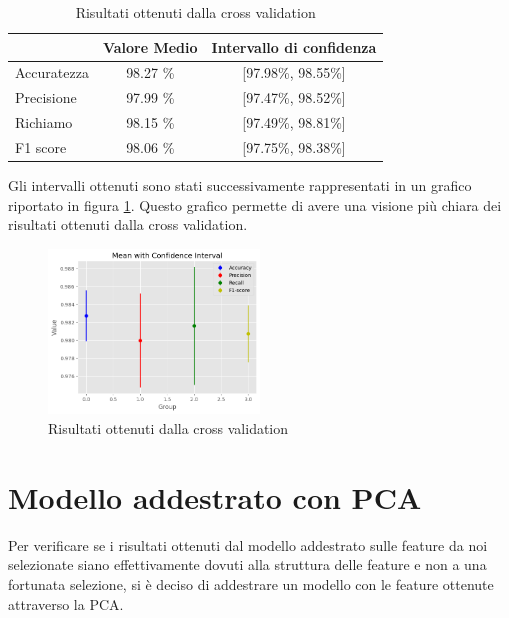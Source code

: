 \begin{table}[ht]
    \centering
    \begin{tabular}{@{}lcc@{}}
        \toprule
        \rowcolor[HTML]{EFEFEF}
        \multicolumn{1}{c}{\cellcolor[HTML]{EFEFEF}\textbf{Metrica}} & \textbf{Valore Medio} & \textbf{Intervallo di confidenza} \\ \midrule
        Accuratezza                                                  & 98.27 \%              & [97.98\%, 98.55\%]                \\
        Precisione                                                   & 97.99 \%              & [97.47\%, 98.52\%]                \\
        Richiamo                                                     & 98.15 \%              & [97.49\%, 98.81\%]                \\
        F1 score                                                     & 98.06 \%              & [97.75\%, 98.38\%]                \\ \bottomrule
    \end{tabular}
    \caption{Risultati ottenuti dalla cross validation}
    \label{tab:risultatiCrossValidation}
\end{table}

Gli intervalli ottenuti sono stati successivamente rappresentati in un grafico
riportato in figura \ref{fig:risultatiCrossValidation}. Questo grafico permette
di avere una visione più chiara dei risultati ottenuti dalla cross validation.

\begin{figure}[!ht]
    \centering
    \includegraphics[width=0.5\textwidth]{img/rete/intervalli_confidenza.png}
    \caption{Risultati ottenuti dalla cross validation}
    \label{fig:risultatiCrossValidation}
\end{figure}
\section{Modello addestrato con PCA}
Per verificare se i risultati ottenuti dal modello addestrato sulle feature da
noi selezionate siano effettivamente dovuti alla struttura delle feature e non
a una fortunata selezione, si è deciso di addestrare un modello con le feature
ottenute attraverso la PCA.

